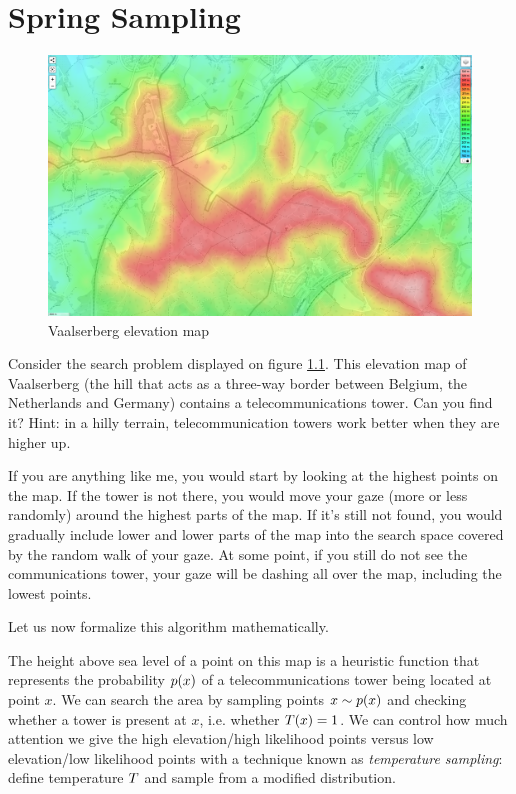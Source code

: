 
\chapter{Spring Sampling}
\label{apdx:spring}

\begin{figure}
    \centering
    \includegraphics[width=\linewidth]{images/vaalserberg_lost.png}
    \caption{Vaalserberg elevation map}
    \label{fig:vaalserberg-q}
\end{figure}


Consider the search problem displayed on figure \ref{fig:vaalserberg-q}. 
This elevation map of Vaalserberg (the hill that acts as a three-way border between Belgium, the Netherlands and Germany) contains a telecommunications tower. 
Can you find it? Hint: in a hilly terrain, telecommunication towers work better when they are higher up.

If you are anything like me, you would start by looking at the highest points on the map.
If the tower is not there, you would move your gaze (more or less randomly) around the highest parts of the map.
If it's still not found, you would gradually include lower and lower parts of the map into the search space covered by the random walk of your gaze.
At some point, if you still do not see the communications tower, your gaze will be dashing all over the map, including the lowest points.

Let us now formalize this algorithm mathematically.

The height above sea level of a point on this map is a heuristic function that represents the probability $p(x)$ of a telecommunications tower being located at point $x$.
We can search the area by sampling points $x \sim p(x)$ and checking whether a tower is present at $x$, i.e. whether $T(x)=1$.
We can control how much attention we give the high elevation/high likelihood points versus low elevation/low likelihood points with a technique known as \emph{temperature sampling}: define temperature $T$ and sample from a modified distribution.

